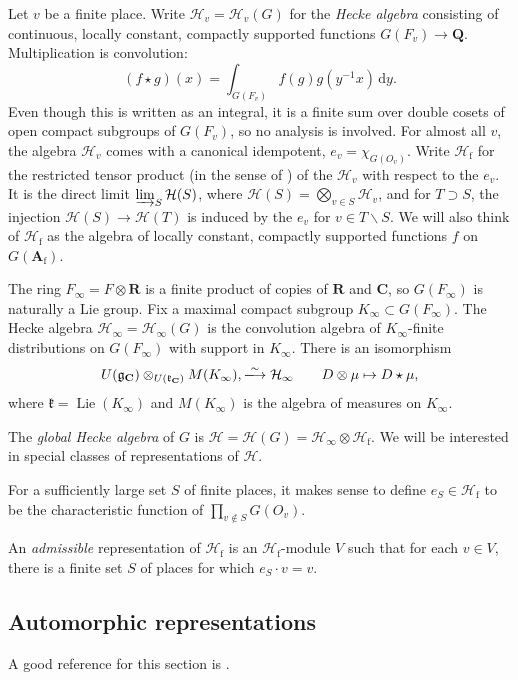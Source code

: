 \documentclass[11pt]{article}
\DeclareMathOperator{\lie}{Lie}
\newcommand{\dA}{\mathbf{A}}
\newcommand{\dC}{\mathbf{C}}
\newcommand{\dR}{\mathbf{R}}
\newcommand{\dQ}{\mathbf{Q}}
\newcommand{\fg}{\mathfrak{g}}
\newcommand{\fk}{\mathfrak{k}}
\newcommand{\dd}{\mathrm{d}}
\newcommand{\finite}{\mathrm{f}}
\newcommand{\hecke}{\mathcal{H}}
\newcommand{\iso}{\xlongrightarrow\sim}
\begin{document}
Let $v$ be a finite place. Write $\hecke_v=\hecke_v(G)$ for the \emph{Hecke 
algebra} consisting of continuous, locally constant, compactly supported 
functions $G(F_v) \to \dQ$. Multiplication is convolution: 
\[
  (f\star g)(x) = \int_{G(F_v)} f(g) g(y^{-1} x)\, \dd y .
\]
Even though this is written as an integral, it is a finite sum over double 
cosets of open compact subgroups of $G(F_v)$, so no analysis is involved. For 
almost all $v$, the algebra $\hecke_v$ comes with a canonical idempotent, 
$e_v=\chi_{G(O_v)}$. Write $\hecke_\finite$ for the restricted tensor product 
(in the sense of \cite[\S 2]{f79}) of the $\hecke_v$ with respect to the 
$e_v$. It is the direct limit $\varinjlim_S \hecke(S)$, where 
$\hecke(S)=\bigotimes_{v\in S} \hecke_v$, and for 
$T\supset S$, the injection $\hecke(S)\to \hecke(T)$ is induced by the 
$e_v$ for $v\in T\smallsetminus S$. We will also think of $\hecke_\finite$ as 
the algebra of locally constant, compactly supported functions $f$ on 
$G(\dA_\finite)$. 

The ring $F_\infty=F\otimes\dR$ is a finite product of copies of $\dR$ and 
$\dC$, so  $G(F_\infty)$ is naturally a Lie group. Fix a maximal compact 
subgroup $K_\infty\subset G(F_\infty)$. The Hecke algebra 
$\hecke_\infty=\hecke_\infty(G)$ is the convolution algebra of $K_\infty$-finite 
distributions on $G(F_\infty)$ with support in $K_\infty$. There is an 
isomorphism 
\[
  U(\fg_\dC)\otimes_{U(\fk_\dC)} M(K_\infty), \iso \hecke_\infty \qquad D\otimes \mu\mapsto D\star \mu ,
\]
where $\fk=\lie(K_\infty)$ and $M(K_\infty)$ is the algebra of measures on 
$K_\infty$. 

The \emph{global Hecke algebra} of $G$ is 
$\hecke=\hecke(G)=\hecke_\infty\otimes\hecke_\finite$. We will be interested in 
special classes of representations of $\hecke$. 

For a sufficiently large set $S$ of finite places, it makes sense to define 
$e_S\in \hecke_\finite$ to be the characteristic function of 
$\prod_{v\notin S} G(O_v)$. 

An \emph{admissible} representation of $\hecke_\finite$ is an 
$\hecke_\finite$-module $V$ such that for each $v\in V$, there is a finite set 
$S$ of places for which $e_S\cdot v = v$. 


\subsection{Automorphic representations}

A good reference for this section is \cite{bj79}. 
\end{document}
